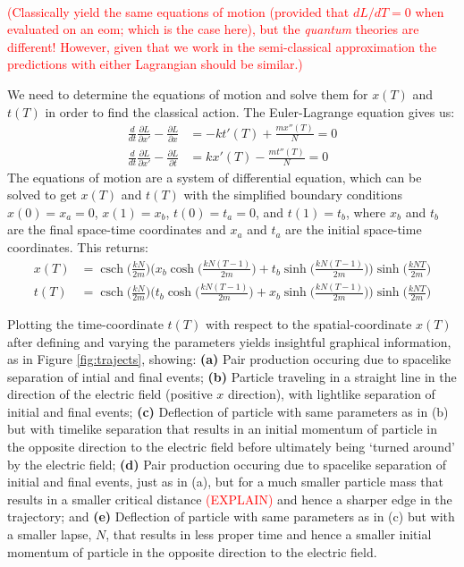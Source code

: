 \documentclass[12pt]{revtex4}
\DeclareMathOperator{\csch}{csch}
\newcommand{\red}{\textcolor{red}}
\begin{document}
\red{\\
(Classically yield the same equations of motion (provided that $dL/dT =0$ when evaluated on an eom; which is the case here), but the \textit{quantum} theories are different! 
However, given that we work in the semi-classical approximation the predictions with either Lagrangian should be similar.)
}

We need to determine the equations of motion and solve them for $x(T)$ and $t(T)$ in order to find the classical action. The Euler-Lagrange equation gives us:
\begin{align*}
\frac{d}{dt}\frac{\partial L}{\partial x'}-\frac{\partial L}{\partial x} &= -k t'(T) + \frac{m x''(T)}{N} =0\\
\frac{d}{dt}\frac{\partial L}{\partial x'}-\frac{\partial L}{\partial t} &= k x'(T) - \frac{m t''(T)}{N} =0
\end{align*}
The equations of motion are a system of differential equation, which can be solved to get $x(T)$ and $t(T)$ with the simplified boundary conditions $x(0) = x_a = 0$, $x(1)=x_b$, $t(0) = t_a = 0$, and $t(1)=t_b$, where $x_b$ and $t_b$ are the final space-time coordinates and $x_a$ and $t_a$ are the initial space-time coordinates. This returns:
\begin{align*}
x(T) &= \csch \bigg(\frac{k N}{2 m}\bigg) \Biggr(x_b \cosh\bigg(\frac{k N (T-1)}{2m}\bigg)+ 
t_b \sinh\bigg(\frac{k N (T-1)}{2m}\bigg)\Biggr) \sinh\bigg(\frac{k N T}{2m}\bigg)\\
t(T)&= \csch \bigg(\frac{k N}{2 m}\bigg) \Biggr(t_b \cosh\bigg(\frac{k N (T-1)}{2m}\bigg)+ 
x_b \sinh\bigg(\frac{k N (T-1)}{2m}\bigg)\Biggr) \sinh\bigg(\frac{k N T}{2m}\bigg)
\end{align*} 

Plotting the time-coordinate $t(T)$ with respect to the spatial-coordinate $x(T)$ after defining and varying the parameters yields insightful graphical information, as in Figure \ref{fig:trajects}, showing: \textbf{(a)} Pair production occuring due to spacelike separation of intial and final events; \textbf{(b)} Particle traveling in a straight line in the direction of the electric field (positive $x$ direction), with lightlike separation of initial and final events; \textbf{(c)} Deflection of particle with same parameters as in (b) but with timelike separation that results in an initial momentum of particle in the opposite direction to the electric field before ultimately being `turned around' by the electric field; \textbf{(d)} Pair production occuring due to spacelike separation of initial and final events, just as in (a), but for a much smaller particle mass that results in a smaller critical distance \red{(EXPLAIN)} and hence a sharper edge in the trajectory; and \textbf{(e)} Deflection of particle with same parameters as in (c) but with a smaller lapse, $N$, that results in less proper time and hence a smaller initial momentum of particle in the opposite direction to the electric field.
\end{document}
